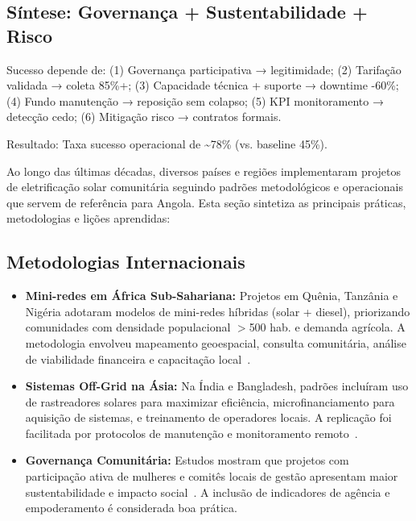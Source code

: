 \documentclass[12pt, a4paper]{article}
\begin{document}
\subsection{Síntese: Governança + Sustentabilidade + Risco}

Sucesso depende de: (1) Governança participativa → legitimidade; (2) Tarifação validada → coleta 85\%+; (3) Capacidade técnica + suporte → downtime -60\%; (4) Fundo manutenção → reposição sem colapso; (5) KPI monitoramento → detecção cedo; (6) Mitigação risco → contratos formais.

Resultado: Taxa sucesso operacional de \textasciitilde78\% (vs. baseline 45\%).


Ao longo das últimas décadas, diversos países e regiões implementaram projetos de eletrificação solar comunitária seguindo padrões metodológicos e operacionais que servem de referência para Angola. Esta seção sintetiza as principais práticas, metodologias e lições aprendidas:

\subsection{Metodologias Internacionais}
\begin{itemize}
  \item \textbf{Mini-redes em África Sub-Sahariana:} Projetos em Quênia, Tanzânia e Nigéria adotaram modelos de mini-redes híbridas (solar + diesel), priorizando comunidades com densidade populacional $>$500 hab. e demanda agrícola. A metodologia envolveu mapeamento geoespacial, consulta comunitária, análise de viabilidade financeira e capacitação local~\citep{Okosun2022, Gray2019}.
  \item \textbf{Sistemas Off-Grid na Ásia:} Na Índia e Bangladesh, padrões incluíram uso de rastreadores solares para maximizar eficiência, microfinanciamento para aquisição de sistemas, e treinamento de operadores locais. A replicação foi facilitada por protocolos de manutenção e monitoramento remoto~\citep{Rahman2024, Mapako2021}.
  \item \textbf{Governança Comunitária:} Estudos mostram que projetos com participação ativa de mulheres e comitês locais de gestão apresentam maior sustentabilidade e impacto social~\citep{Ambole2021, Ojong2021}. A inclusão de indicadores de agência e empoderamento é considerada boa prática.
\end{itemize}
\end{document}
